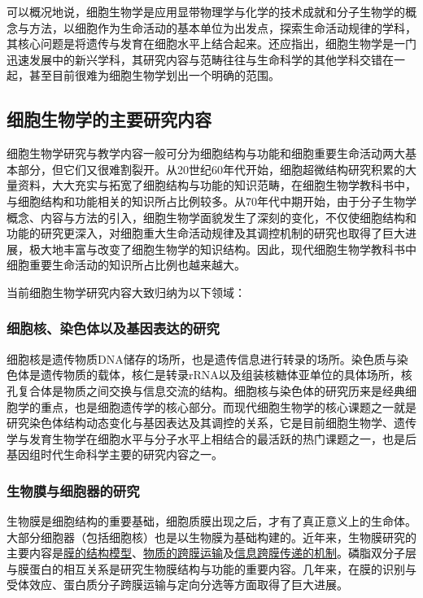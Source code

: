 可以概况地说，细胞生物学是应用显带物理学与化学的技术成就和分子生物学的概念与方法，以细胞作为生命活动的基本单位为出发点，探索生命活动规律的学科，其核心问题是将遗传与发育在细胞水平上结合起来。还应指出，细胞生物学是一门迅速发展中的新兴学科，其研究内容与范畴往往与生命科学的其他学科交错在一起，甚至目前很难为细胞生物学划出一个明确的范围。

\subsection{细胞生物学的主要研究内容}

细胞生物学研究与教学内容一般可分为细胞结构与功能和细胞重要生命活动两大基本部分，但它们又很难割裂开。从20世纪60年代开始，细胞超微结构研究积累的大量资料，大大充实与拓宽了细胞结构与功能的知识范畴，在细胞生物学教科书中，与细胞结构和功能相关的知识所占比例较多。从70年代中期开始，由于分子生物学概念、内容与方法的引入，细胞生物学面貌发生了深刻的变化，不仅使细胞结构和功能的研究更深入，对细胞重大生命活动规律及其调控机制的研究也取得了巨大进展，极大地丰富与改变了细胞生物学的知识结构。因此，现代细胞生物学教科书中细胞重要生命活动的知识所占比例也越来越大。

当前细胞生物学研究内容大致归纳为以下领域：

\subsubsection{细胞核、染色体以及基因表达的研究}

细胞核是遗传物质DNA储存的场所，也是遗传信息进行转录的场所。染色质与染色体是遗传物质的载体，核仁是转录rRNA以及组装核糖体亚单位的具体场所，核孔复合体是物质之间交换与信息交流的结构。细胞核与染色体的研究历来是经典细胞学的重点，也是细胞遗传学的核心部分。而现代细胞生物学的核心课题之一就是研究染色体结构动态变化与基因表达及其调控的关系，它是目前细胞生物学、遗传学与发育生物学在细胞水平与分子水平上相结合的最活跃的热门课题之一，也是后基因组时代生命科学主要的研究内容之一。

\subsubsection{生物膜与细胞器的研究}

生物膜是细胞结构的重要基础，细胞质膜出现之后，才有了真正意义上的生命体。大部分细胞器（包括细胞核）也是以生物膜为基础构建的。近年来，生物膜研究的主要内容是\underline{膜的结构模型}、\underline{物质的跨膜运输}及\underline{信息跨膜传递的机制}。磷脂双分子层与膜蛋白的相互关系是研究生物膜结构与功能的重要内容。几年来，在膜的识别与受体效应、蛋白质分子跨膜运输与定向分选等方面取得了巨大进展。

